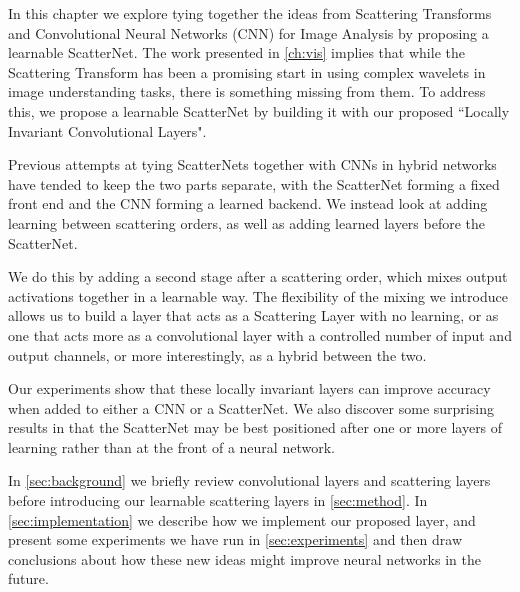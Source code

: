In this chapter we explore tying together the ideas from Scattering Transforms
and Convolutional Neural Networks (CNN) for Image Analysis by proposing a learnable
ScatterNet. The work presented in \autoref{ch:vis} implies that while the Scattering 
Transform has been a promising start in using complex wavelets in image
understanding tasks, there is something missing from them. To address this, we
propose a learnable ScatterNet by building it with our proposed ``Locally Invariant
Convolutional Layers".

Previous attempts at tying ScatterNets together with CNNs in hybrid networks
\cite{oyallon_scaling_2017, oyallon_hybrid_2017, singh_scatternet_2018} have
tended to keep the two parts separate, with the ScatterNet forming a fixed front
end and the CNN forming a learned backend. We instead look at adding learning
between scattering orders, as well as adding learned layers before the
ScatterNet. 

%
We do this by adding a second stage after a scattering order, which mixes output
activations together in a learnable way. The flexibility of the mixing we introduce allows
us to build a layer that acts as a Scattering Layer with no learning, or
as one that acts more as a convolutional layer with a controlled number of input
and output channels, or more interestingly, as a hybrid between the two. 

Our experiments show that these locally invariant layers can improve
accuracy when added to either a CNN or a ScatterNet.  We also discover some
surprising results in that the ScatterNet may be best positioned after one or
more layers of learning rather than at the front of a neural network.

In \autoref{sec:background} we briefly review convolutional layers and scattering
layers before introducing our learnable scattering layers in \autoref{sec:method}.
In \autoref{sec:implementation} we describe how we implement our proposed layer,
and present some experiments we have run in \autoref{sec:experiments} and then
draw conclusions about how these new ideas might improve neural networks in the
future.
